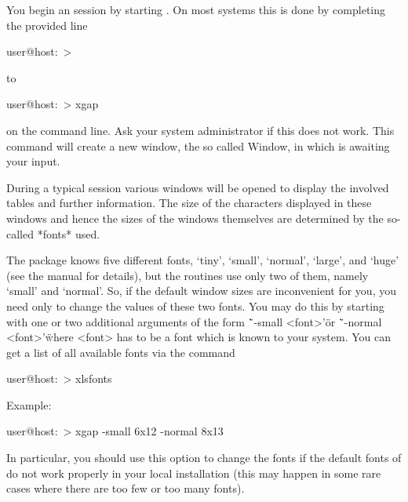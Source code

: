 



You begin an {\ITC} session by starting {\XGAP}. On most systems this
is done by completing the provided line

\begintt
user@host:~>
\endtt

to

\begintt
user@host:~> xgap
\endtt

on the command line. Ask your system administrator if this does not
work. This command will create a new window, the so called {\GAP}
Window, in which {\GAP} is awaiting your input.

During a typical {\ITC} session various windows will be opened to
display the involved tables and further information. The size of the
characters displayed in these windows and hence the sizes of the
windows themselves are determined by the so-called *fonts* used.

The {\XGAP} package knows five different fonts, `tiny', `small',
`normal', `large', and `huge' (see the {\XGAP} manual for details), but
the {\ITC} routines use only two of them, namely `small' and `normal'.
So, if the default {\ITC} window sizes are inconvenient for you, you
need only to change the values of these two fonts. You may do this by
starting {\XGAP} with one or two additional arguments of the form
\"`-small <font>'\" or \"`-normal <font>'\" where <font> has to be a
font which is known to your system. You can get a list of all available
fonts via the command

\begintt
user@host:~> xlsfonts
\endtt

Example:

\begintt
user@host:~> xgap -small 6x12 -normal 8x13
\endtt

In particular, you should use this option to change the fonts if the
default fonts of {\XGAP} do not work properly in your local installation
(this may happen in some rare cases where there are too few or too many
fonts).


